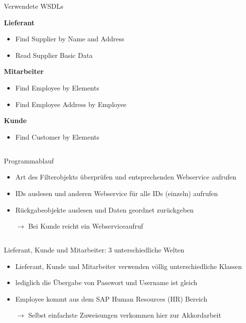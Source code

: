 \documentclass[xcolor={usenames,dvipsnames}, compress, 10pt]{beamer}
\begin{document}
\begin{frame}{Verwendete WSDLs}

\textbf{Lieferant}
\begin{itemize}
\item Find Supplier by Name and Address
\item Read Supplier Basic Data 
\end{itemize}

\textbf{Mitarbeiter}
\begin{itemize}
\item Find Employee by Elements
\item Find Employee Address by Employee
\end{itemize}

\textbf{Kunde}
\begin{itemize}
\item Find Customer by Elements
\end{itemize}

\end{frame}

\subsection*{}

\begin{frame}{Programmablauf}
\begin{center}

\begin{itemize}
\item Art des Filterobjekts überprüfen und entsprechenden Webservice aufrufen
\item IDs auslesen und anderen Webservice für alle IDs (einzeln) aufrufen
\item Rückgabeobjekte auslesen und Daten geordnet zurückgeben
\item[$\rightarrow$]Bei Kunde reicht ein Webserviceaufruf
\end{itemize}

\end{center}
\end{frame}

\subsection*{}

\begin{frame}{Lieferant, Kunde und Mitarbeiter: 3 unterschiedliche Welten}
\begin{center}

\begin{itemize}
\item Lieferant, Kunde und Mitarbeiter verwenden völlig unterschiedliche Klassen
\item lediglich die Übergabe von Passwort und Username ist gleich
\item Employee kommt aus dem SAP Human Resources (HR) Bereich
\item [$\rightarrow$]Selbst einfachste Zuweisungen verkommen hier zur Akkordarbeit
\end{itemize}

\end{center}
\end{frame}
\end{document}

